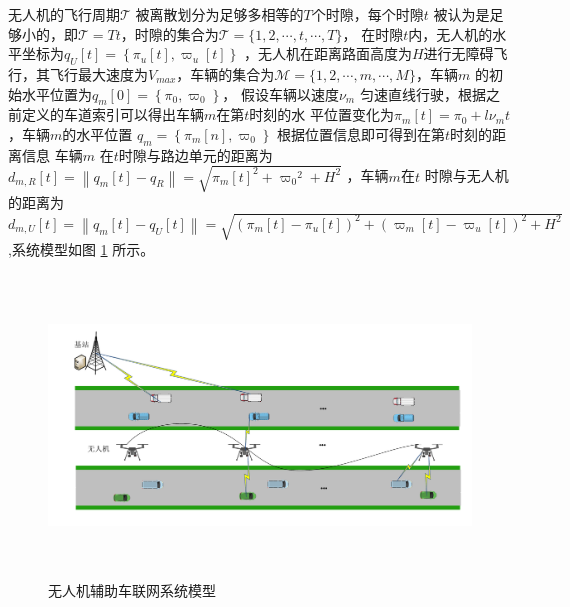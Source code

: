 无人机的飞行周期$\mathcal{T}$ 被离散划分为足够多相等的$T $个时隙，每个时隙$t$ 被认为是足够小的，即$\mathcal{T}=Tt $，时隙的集合为$\mathcal{T}=\{1,2,\cdots ,t,\cdots ,T\}$，
在时隙$t$内，无人机的水平坐标为$q_U\left[t\right]=\left\{\pi_u\left[t\right],\varpi_u\left[t\right]\right\}$
，无人机在距离路面高度为$H$进行无障碍飞行，其飞行最大速度为$V_{max}$，车辆的集合为$\mathcal{M}=\{1,2,\cdots ,m,\cdots ,M\}$，车辆$m$ 的初始水平位置为$q_m\left[0\right]=\left\{\pi_0,\varpi_0\right\}$，
假设车辆以速度$\nu_m$ 匀速直线行驶，根据之前定义的车道索引可以得出车辆$m$在第$t$时刻的水
平位置变化为$\pi_m\left[t\right]=\pi_0+l\nu_m t$，车辆$m$的水平位置 $q_m=\left\{\pi_m\left[n\right],\varpi_0\right\}$
根据位置信息即可得到在第$t$时刻的距离信息
车辆$m$ 在$t$时隙与路边单元的距离为${{d}_{m,R}}\left[ t \right]=\left\| {{q}_{m}}\left[ t \right]-{{q}_{R}} \right\|=\sqrt{{{\pi}_{m}}{{\left[ t \right]}^{2}}+{{\varpi}_{0}}^{2}+{{H}^{2}}}$
，车辆$m$在$t$ 时隙与无人机的距离为
$
{{d}_{m,U}}\left[ t \right]=\left\| {{q}_{m}}\left[ t \right]-{{q}_{U}}\left[ t \right] \right\|=\sqrt{{{\left( {{\pi}_{m}}\left[ t \right]-{{\pi}_{u}}\left[ t \right] \right)}^{2}}+{{\left( {{\varpi}_{m}}\left[ t \right]-{{\varpi}_{u}}\left[ t \right] \right)}^{2}}+{{H}^{2}}}\
$,系统模型如图 \ref{systemuav2} 所示。%

\begin{figure}[H]
\centering
\includegraphics[width=12cm,height=8cm]{figures//chap4//第四章系统模型图.pdf}
\caption{无人机辅助车联网系统模型}
\label{systemuav2}
\end{figure}
